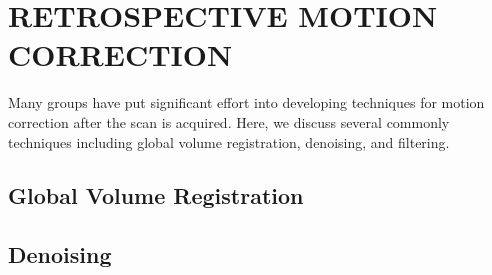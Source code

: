 \section{RETROSPECTIVE MOTION CORRECTION}

Many groups have put significant effort into developing techniques for motion correction after the scan is acquired. Here, we discuss several commonly techniques including global volume registration, denoising, and filtering.

\subsection{Global Volume Registration}




\subsection{Denoising}



